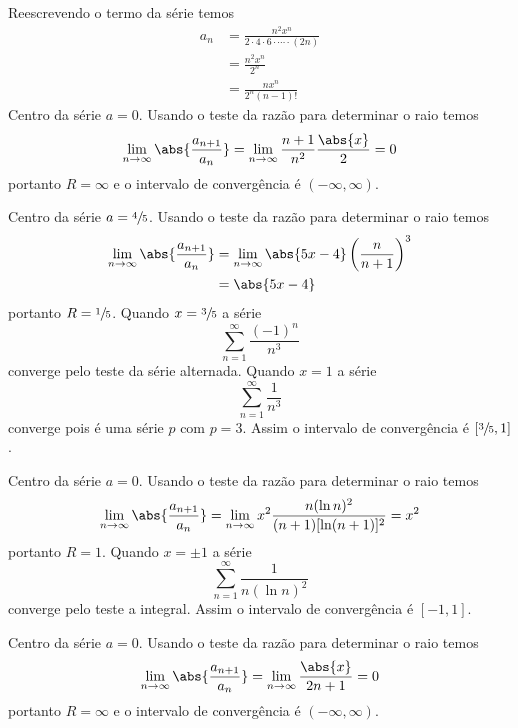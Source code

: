 \begin{exercises}
\begin{exercise}
\begin{answer}
\begin{alphalist}
  \item Reescrevendo o termo da série temos
  \begin{align*}
  	a_n & = \frac{n^2x^n}{2\cdot4\cdot6\cdot\cdots\cdot(2n)} \\
  	    & = \frac{n^2x^n}{2^n}                                   \\
  	    & = \frac{nx^n}{2^n(n-1)!}
  \end{align*}
  Centro da série $a=0$.
  Usando o teste da razão para determinar o raio temos
  \[
    \lim_{n\to\infty}\abs{\frac{a_{n+1}}{a_n}} =
    \lim_{n\to\infty} \frac{n+1}{n^2}\frac{\abs{x}}{2} = 0
  \]
  portanto $R=\infty$ e o intervalo de convergência é $\left(-\infty, \infty\right)$.

  \item Centro da série $a=\sfrac{4}{5}$.
  Usando o teste da razão para determinar o raio temos
  \begin{align*}
  	\lim_{n\to\infty}\abs{\frac{a_{n+1}}{a_n}}
      & = \lim_{n\to\infty} \abs{5x-4}\left(\frac{n}{n+1}\right)^3 \\
  	  & = \abs{5x-4}
  \end{align*}
  portanto $R=\sfrac{1}{5}$.
  Quando $x=\sfrac{3}{5}$ a série
  \[
    \sum_{n=1}^{\infty} \frac{(-1)^n}{n^3}
  \]
  converge pelo teste da série alternada.
  Quando $x=1$ a série
  \[
    \sum_{n=1}^{\infty} \frac{1}{n^3}
  \]
  converge pois é uma série $p$ com $p=3$.
  Assim o intervalo de convergência é $\left[\sfrac{3}{5}, 1\right]$.

  \item Centro da série $a=0$.
  Usando o teste da razão para determinar o raio temos
  \[
    \lim_{n\to\infty}\abs{\frac{a_{n+1}}{a_n}} =
    \lim_{n\to\infty} x^2\frac{n(\ln n)^2}{(n+1)[\ln(n+1)]^2} = x^2
  \]
  portanto $R=1$.
  Quando $x=\pm 1$ a série
  \[
    \sum_{n=1}^{\infty} \frac{1}{n(\ln n)^2}
  \]
  converge pelo teste a integral.
  Assim o intervalo de convergência é $\left[-1, 1\right]$.

  \item Centro da série $a=0$.
  Usando o teste da razão para determinar o raio temos
  \[
    \lim_{n\to\infty}\abs{\frac{a_{n+1}}{a_n}} =
    \lim_{n\to\infty} \frac{\abs{x}}{2n+1} = 0
  \]
  portanto $R=\infty$ e o intervalo de convergência é $\left(-\infty, \infty\right)$.


\end{alphalist}
\end{answer}
\end{exercise}
\end{exercises}
